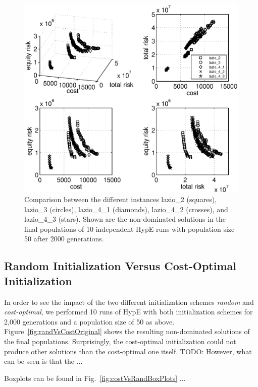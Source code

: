 \documentclass[preprint,12pt]{elsarticle}
\newcommand{\TODO}[1]{{\color{red}TODO: #1}}
\begin{document}
\begin{figure}
	\centering
	\includegraphics[width=0.75\columnwidth]{../experiments/randVsCost/compAll_2000gens.eps}
	\caption{\label{fig:compareAll} Comparison between the different instances lazio\_2 (squares), lazio\_3 (circles), lazio\_4\_1 (diamonds), lazio\_4\_2 (crosses), and lazio\_4\_3 (stars). Shown are the non-dominated solutions in the final populations of 10 independent HypE runs with population size 50 after 2000 generations.}
\end{figure}






\subsection{Random Initialization Versus Cost-Optimal Initialization}
In order to see the impact of the two different initialization schemes \emph{random} and \emph{cost-optimal}, we performed 10 runs of HypE with both initialization schemes for 2,000 generations and a population size of 50 as above. Figure~\ref{fig:randVsCostOriginal} shows the resulting non-dominated solutions of the final populations. Surprisingly, the cost-optimal initialization could not produce other solutions than the cost-optimal one itself. \TODO{However, what can be seen is that the ...}


Boxplots can be found in Fig.~\ref{fig:costVsRandBoxPlots} ...
\end{document}
